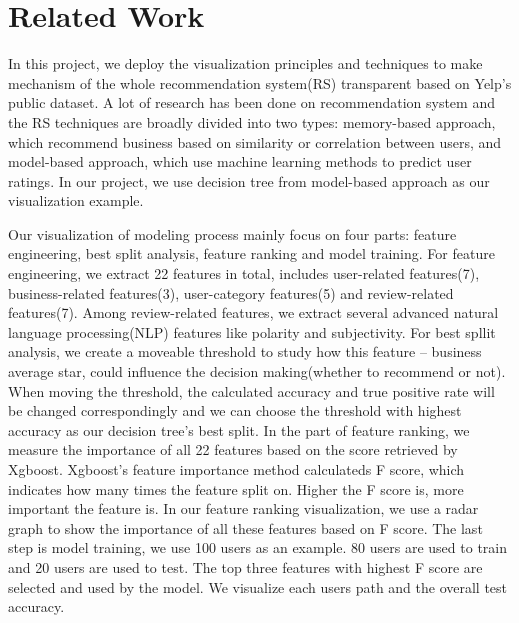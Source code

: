 \section{Related Work}
\label{sec:related} 


In this project, we deploy the visualization principles and techniques to make mechanism of the whole recommendation system(RS) transparent based on Yelp's public dataset\cite{yelpdata}. A lot of research has been done on recommendation system and the RS techniques are broadly divided into two types: memory-based approach, which recommend business based on similarity or correlation between users\cite{sarwar2001item}, and model-based approach, which use machine learning methods to predict user ratings\cite{portugal2017use}. In our project, we use decision tree from model-based approach\cite{cho2002personalized} as our visualization example. 

Our visualization of modeling process mainly focus on four parts: feature engineering, best split analysis, feature ranking and model training. For feature engineering, we extract 22 features in total, includes user-related features(7), business-related features(3), user-category features(5) and review-related features(7). Among review-related features, we extract several advanced natural language processing(NLP) features like polarity\cite{das2012sentimantics} and subjectivity\cite{montoyo2012subjectivity}. For best spllit analysis, we create a moveable threshold to study how this feature -- business average star, could influence the decision making(whether to recommend or not). When moving the threshold, the calculated accuracy and true positive rate\cite{spackman1989signal} will be changed correspondingly and we can choose the threshold with highest accuracy as our decision tree's best split. In the part of feature ranking, we measure the importance of all 22 features based on the score retrieved by Xgboost\cite{chen2016xgboost}. Xgboost's feature importance method calculateds F score, which indicates how many times the feature split on. Higher the F score is, more important the feature is. In our feature ranking visualization, we use a radar graph to show the importance of all these features based on F score. The last step is model training, we use 100 users as an example. 80 users are used to train and 20 users are used to test. The top three features with highest F score are selected and used by the model. We visualize each users path and the overall test accuracy.